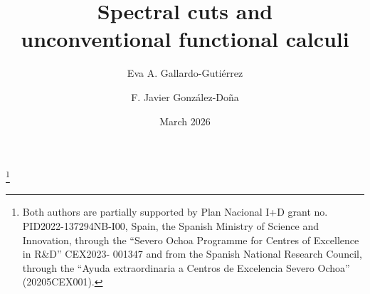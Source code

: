 \documentclass[11pt]{amsart}
\theoremstyle{definition}
\theoremstyle{remark}
\numberwithin{equation}{section}
\begin{document}
	
	\title[Spectral cuts and unconventional functional calculi]{Spectral cuts and \\ unconventional functional calculi}
	
	
	\author{Eva A. Gallardo-Guti\'{e}rrez}
	\address{Eva A. Gallardo-Guti\'errez \newline
		Departamento de An\'alisis Matem\'atico y Matem\'atica Aplicada,\newline
		Facultad de Ciencias Matem\'aticas,
		\newline Universidad Complutense de
		Madrid, \newline
		Plaza de Ciencias N$^{\underbar{\Tiny o}}$ 3, 28040 Madrid,  Spain
		\newline
		and Instituto de Ciencias Matem\'aticas ICMAT (CSIC-UAM-UC3M-UCM),
		\newline Madrid,  Spain } 
	
	
	\author[F. Javier González-Doña]{F. Javier González-Doña}
\address{F. Javier González-Doña
\newline  Departamento de Matemática Aplicada II and IMUS, \newline Escuela Técnica Superior de Ingeniería de Ingeniería,\newline
Universidad de Sevilla,\newline
Camino de los Descubrimientos s/n, 41092, Seville, Spain}
	
	
	\thanks{Both authors are partially supported by Plan Nacional  I+D grant no. PID2022-137294NB-I00, Spain,
		the Spanish Ministry of Science and Innovation, through the ``Severo Ochoa Programme for Centres of Excellence in R\&D'' CEX2023-
		001347 and from the Spanish National Research Council, through the ``Ayuda extraordinaria a Centros de Excelencia Severo Ochoa'' (20205CEX001).}
	
	
	\date{March 2026}
	
	
\end{document}
